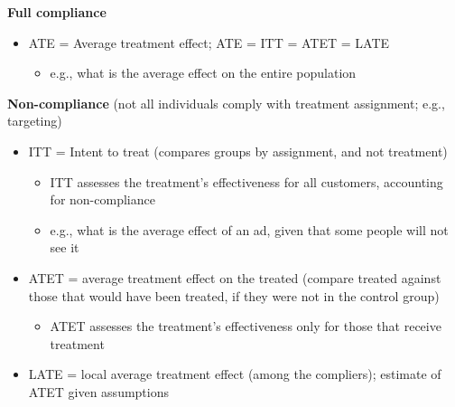 \documentclass[10pt]{article}
\begin{document}
\textbf{Full compliance}
\begin{itemize}
    \item ATE = Average treatment effect; ATE = ITT = ATET = LATE 
    \begin{itemize}
        \item e.g., what is the average effect on the entire population
    \end{itemize}
\end{itemize}
\textbf{Non-compliance} (not all individuals comply with treatment assignment; e.g., targeting)
\begin{itemize}
    \item ITT = Intent to treat (compares groups by assignment, and not treatment)
    \begin{itemize}
        \item ITT assesses the treatment's effectiveness for all customers, accounting for non-compliance 
        \item e.g., what is the average effect of an ad, given that some people will not see it 
    \end{itemize}
    \item ATET = average treatment effect on the treated (compare treated against those that would have been treated, if they were not in the control group)
    \begin{itemize}
        \item ATET assesses the treatment's effectiveness only for those that receive treatment
    \end{itemize}
    \item LATE = local average treatment effect (among the compliers); estimate of ATET given assumptions
\end{itemize}
\end{document}
